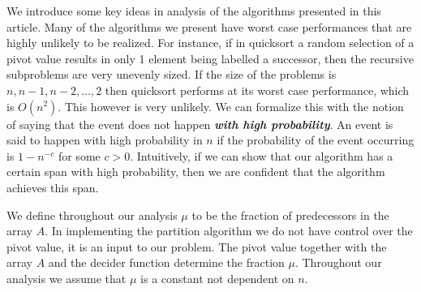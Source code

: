 \documentclass[twocolumn, twoside, 11pt]{article}
\newcommand{\defn}[1]       {{\textit{\textbf{\boldmath #1}}}}
\renewcommand{\paragraph}[1]{\vspace{0.09in}\noindent{\bf \boldmath #1.}}
\begin{document}
\paragraph{Further Preliminaries}
We introduce some key ideas in analysis of the algorithms presented in this article.
Many of the algorithms we present have worst case performances that are highly unlikely to be realized.
For instance, if in quicksort a random selection of a pivot value results in only 1 element being labelled a successor, then the recursive subproblems are very unevenly sized.
If the size of the problems is $n, n-1, n-2,\ldots,2$ then quicksort performs at its worst case performance, which is $O(n^2)$.
This however is very unlikely.
We can formalize this with the notion of saying that the event does not happen \defn{with high probability}.
An event is said to happen with high probability in $n$ if the probability of the event occurring is $1-n^{-c}$ for some $c>0$.
Intuitively, if we can show that our algorithm has a certain span with high probability, then we are confident that the algorithm achieves this span.

We define throughout our analysis $\mu$ to be the fraction of predecessors in the array $A$.
In implementing the partition algorithm we do not have control over the pivot value, it is an input to our problem.
The pivot value together with the array $A$ and the decider function determine the fraction $\mu$.
Throughout our analysis we assume that $\mu$ is a constant not dependent on $n$.
\end{document}
